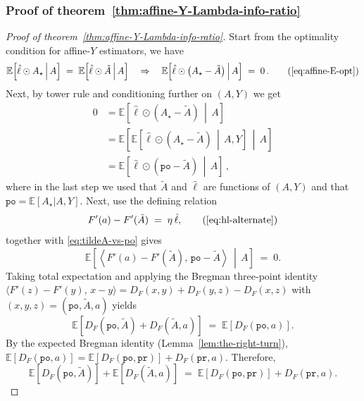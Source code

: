 \documentclass{article}
\theoremstyle{plain}
\theoremstyle{definition}
\newcommand{\pr}{\texttt{pr}}
\newcommand{\po}{\texttt{po}}
\newcommand{\E}{\mathbb E}
\newcommand{\hl}{\hat{\ell}\xspace}
\begin{document}
\subsubsection{Proof of theorem~\ref{thm:affine-Y-Lambda-info-ratio}}
\label{proof:thm:affine-Y-Lambda-info-ratio}
\begin{proof}[Proof of theorem~\ref{thm:affine-Y-Lambda-info-ratio}]
    Start from the optimality condition for affine-$Y$ estimators,
    we have
    \begin{equation}
        \E\!\left[\hl \odot A_\star \,\middle|\, A \right]
        \;=\;
        \E\!\left[\hl \odot \tilde{A} \,\middle|\, A \right]
        \quad \Rightarrow \quad
        \E\!\left[\hl \odot \left(A_\star-\tilde{A}\right) \,\middle|\, A \right] \;=\; 0
        \,.
        \tag{\ref{eq:affine-E-opt}}
    \end{equation}
    Next, by tower rule and conditioning further on $(A,Y)$ we get
    \begin{align}
        0 & = \E\!\left[\hl \odot \left(A_\star-\tilde{A}\right) \,\middle|\, A \right] \nonumber \\
          & = \E\!\left[
            \E\!\left[\hl \odot \left(A_\star-\tilde{A}\right) \,\middle|\, A, Y \right]
            \,\middle|\, A
        \right]                                                                         \nonumber \\
          & = \E\!\left[
            \hl \odot
            \left(\po-\tilde{A}\right)
            \,\middle|\, A
            \right]\,,
        \label{eq:tildeA-vs-po}
    \end{align}
    where in the last step we used that $\tilde{A}$ and $\hl$ are functions of $(A,Y)$
    and that $\po=\E[A_\star|A,Y]$.
    Next, use the defining relation
    \begin{equation}
        F'(a) - F'(\tilde{A}) \;=\; \eta\,\hl,
        \tag{\ref{eq:hl-alternate}}
    \end{equation}
    together with \eqref{eq:tildeA-vs-po} gives
    \[
        \E\!\left[
            \left\langle F'(a) - F'(\tilde{A}),\, \po - \tilde{A} \right\rangle
            \,\middle|\, A
            \right] \;=\; 0.
    \]
    Taking total expectation and applying the Bregman three‑point identity
    \(
    \langle F'(z)-F'(y),\,x-y\rangle
    = D_F(x,y)+D_F(y,z)-D_F(x,z)
    \)
    with $(x,y,z)=(\po,\tilde{A},a)$ yields
    \[
        \E\!\left[D_F(\po,\tilde{A}) + D_F(\tilde{A}, a)\right]
        \;=\;
        \E\!\left[D_F(\po, a)\right].
    \]
    By the expected Bregman identity (Lemma~\ref{lem:the-right-turn}),
    \(
    \E[D_F(\po, a)] = \E[D_F(\po,\pr)] + D_F(\pr,a).
    \)
    Therefore,
    \begin{equation}
        \E\!\left[D_F(\po,\tilde{A})\right] + \E\!\left[D_F(\tilde{A}, a)\right]
        \;=\;
        \E\!\left[D_F(\po,\pr)\right] + D_F(\pr,a).
        \label{eq:EBI-key}
    \end{equation}


\end{proof}
\end{document}
